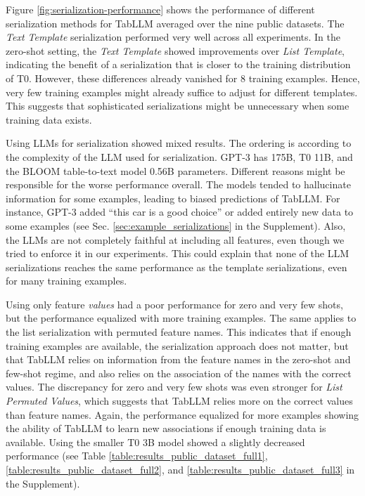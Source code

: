 Figure \ref{fig:serialization-performance} shows the performance of different serialization methods for TabLLM averaged over the nine public datasets. The \emph{Text Template} serialization performed very well across all experiments. In the zero-shot setting, the \emph{Text Template} showed improvements over \emph{List Template}, indicating the benefit of a serialization that is closer to the training distribution of T0. However, these differences already vanished for 8 training examples. Hence, very few training examples might already suffice to adjust for different templates. This suggests that sophisticated serializations might be unnecessary when some training data exists.

Using LLMs for serialization showed mixed results. The ordering is according to the complexity of the LLM used for serialization. GPT-3 has 175B, T0 11B, and the BLOOM table-to-text model 0.56B parameters. Different reasons might be responsible for the worse performance overall. The models tended to hallucinate information for some examples, leading to biased predictions of TabLLM. For instance, GPT-3 added ``this car is a good choice'' or added entirely new data to some examples (see Sec. \ref{sec:example_serializations} in the Supplement). Also, the LLMs are not completely faithful at including all features, even though we tried to enforce it in our experiments. This could explain that none of the LLM serializations reaches the same performance as the template serializations, even for many training examples.

Using only feature \textit{values} had a poor performance for zero and very few shots, but the performance equalized with more training examples. The same applies to the list serialization with permuted feature names. This indicates that if enough training examples are available, the serialization approach does not matter, but that TabLLM relies on information from the feature names in the zero-shot and few-shot regime, and also relies on the association of the names with the correct values. The discrepancy for zero and very few shots was even stronger for \textit{List Permuted Values}, which suggests that TabLLM relies more on the correct values than feature names. Again, the performance equalized for more examples showing the ability of TabLLM to learn new associations if enough training data is available. Using the smaller T0 3B model showed a slightly decreased performance (see Table \ref{table:results_public_dataset_full1}, \ref{table:results_public_dataset_full2}, and \ref{table:results_public_dataset_full3} in the Supplement).


